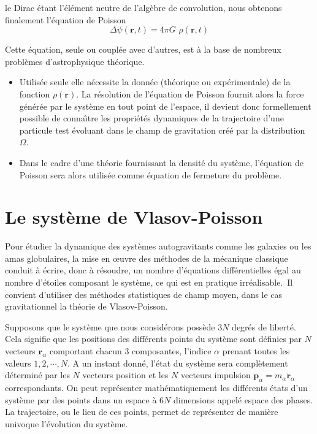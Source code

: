 {le {Dirac} \'{e}tant l'\'{e}l\'{e}ment neutre de l'alg\`{e}bre de
{convolution}, nous obtenons finalement l'\'{e}quation de {Poisson} }
\[
\Delta\psi(\mathbf{r},t)=4\pi G\,\,\rho(\mathbf{r},t)
\]


{Cette \'{e}quation, seule ou coupl\'{e}e avec d'autres, est \`{a} la base de
nombreux pro\-bl\`{e}\-mes d'astrophysique th\'{e}orique. }

\begin{itemize}
\item {Utilis\'{e}e seule elle n\'{e}cessite la donn\'{e}e (th\'{e}orique ou
exp\'{e}rimentale) de la fonction $\rho(\mathbf{r})$. La r\'{e}solution de
l'\'{e}quation de {Poisson} fournit alors la force g\'{e}n\'{e}r\'{e}e par le
syst\`{e}me en tout point de l'espace, il devient donc formellement possible
de conna\^{\i}tre les propri\'{e}t\'{e}s dynamiques de la trajectoire d'une
particule test \'{e}voluant dans le champ de gravitation cr\'{e}\'{e} par la
distribution $\Omega$. }

\item {Dans le cadre d'une th\'{e}orie fournissant la densit\'{e} du
syst\`{e}me, l'\'{e}quation de {Poisson} sera alors utilis\'{e}e comme
\'{e}quation de fermeture du probl\`{e}me. }
\end{itemize}

\section{Le syst\`{e}me de Vlasov-Poisson}

Pour \'{e}tudier la dynamique des syst\`{e}mes autogravitants comme les
galaxies ou les amas globulaires, la mise en \oe uvre des m\'{e}\-tho\-des de
la m\'{e}canique classique conduit \`{a} \'{e}crire, donc \`{a} r\'{e}soudre,
un nombre d'\'{e}quations diff\'{e}rentielles \'{e}gal au nombre d'\'{e}toiles
composant le syst\`{e}me, ce qui est en pratique irr\'{e}alisable.\ Il
convient d'utiliser des m\'{e}thodes statistiques de champ moyen, dans le cas
gravitationnel la th\'{e}orie de Vlasov-Poisson.\ 

Supposons que le syst\`{e}me que nous consid\'{e}rons poss\`{e}de $3N$
degr\'{e}s de libert\'{e}. Cela signifie que les positions des diff\'{e}rents
points du syst\`{e}me sont d\'{e}finies par $N$ vecteurs $\mathbf{r}_{\alpha}$
comportant chacun 3 composantes, l'indice $\alpha$ prenant toutes les valeurs
$1,2,\cdots,N$. A un instant donn\'{e}, l'\'{e}tat du syst\`{e}me sera
compl\`{e}tement d\'{e}termin\'{e} par les $N$ vecteurs position et les $N$
vecteurs impulsion $\mathbf{p}_{\alpha}=m_{\alpha}\mathbf{\dot{r}}_{\alpha}$
correspondants. On peut repr\'{e}senter math\'{e}matiquement les
diff\'{e}rents \'{e}tats d'un syst\`{e}me par des points dans un espace \`{a}
$6N$ {dimension}s appel\'{e} espace des phases. La trajectoire, ou le lieu de
ces points, permet de repr\'{e}senter de mani\`{e}re univoque l'\'{e}volution
du syst\`{e}me.

